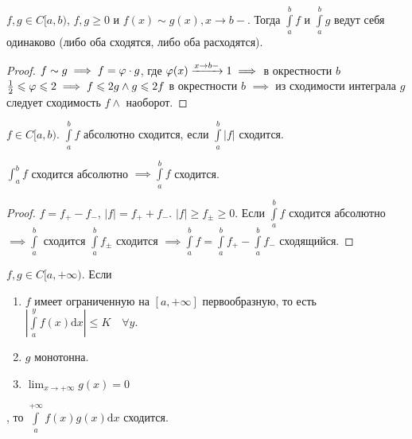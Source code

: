 \begin{consequence}
    $f, g \in C[a, b)$,  $f, g \ge 0$ и $f(x) \sim g(x), x \to b-$. Тогда  $\int\limits_a^b f$ и  $\int\limits_a^b g$ ведут себя одинаково (либо оба сходятся, либо оба расходятся).
\end{consequence}
\begin{proof}
    $f \sim g \implies f = \varphi \cdot g$, где  $\varphi(x) \xrightarrow{x \to b-} 1 \implies$ в окрестности $b$  $\frac{1}{2} \leqslant \varphi \leqslant 2 \implies f \leqslant 2g \land g \leqslant 2f$ в окрестности $b$  $\implies$ из сходимости интеграла  $g$ следует сходимость $f \land$ наоборот. 
\end{proof}
\begin{definition}
    $f \in C[a, b)$. $\int\limits_a^b f$ абсолютно сходится, если  $\int\limits_a^b |f|$ сходится.
\end{definition}
\begin{theorem}
    $\int_a^b f$ сходится абсолютно  $\implies \int\limits_a^b f$ сходится.
\end{theorem}
\begin{proof}
    $f = f_+ - f_-$,  $|f| = f_+ + f_-$.  $|f| \ge f_\pm \ge 0$. Если $\int\limits_a^b f$ сходится абсолютно  $\implies \int\limits_a^b$ сходится  $\int\limits_a^b f_{\pm}$ сходится  $\implies \int\limits_a^b f = \int\limits_a^b f_+ - \int\limits_a^b f_-$ сходящийся.
\end{proof}
\begin{theorem}
    $f, g \in C[a, +\infty)$. Если
    \begin{enumerate}
        \item $f$ имеет ограниченную на  $[a, +\infty]$ первообразную, то есть  $\left| \int\limits_a^y f(x) \mathrm{d}x \right| \le K \quad \forall y$.
        \item $g$ монотонна.
        \item  $\lim_{x \to +\infty} g(x) = 0$
    \end{enumerate}, то $\int\limits_a^{+\infty} f(x)g(x) \mathrm{d}x$ сходится.
\end{theorem}
